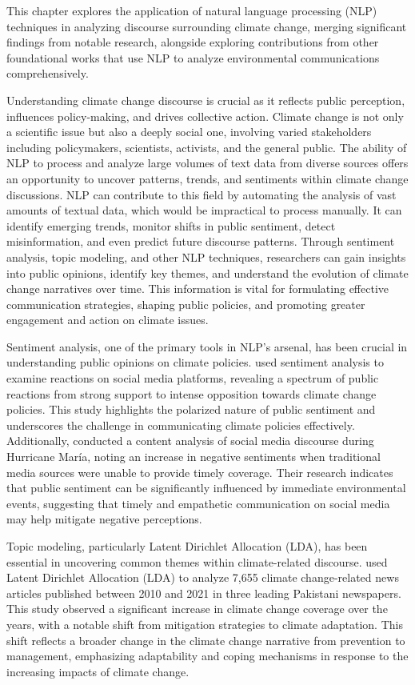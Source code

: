 This chapter explores the application of natural language processing (NLP) techniques in analyzing discourse surrounding climate change, merging significant findings from notable research, alongside exploring contributions from other foundational works that use NLP to analyze environmental communications comprehensively.

Understanding climate change discourse is crucial as it reflects public perception, influences policy-making, and drives collective action. Climate change is not only a scientific issue but also a deeply social one, involving varied stakeholders including policymakers, scientists, activists, and the general public. The ability of NLP to process and analyze large volumes of text data from diverse sources offers an opportunity to uncover patterns, trends, and sentiments within climate change discussions. NLP can contribute to this field by automating the analysis of vast amounts of textual data, which would be impractical to process manually. It can identify emerging trends, monitor shifts in public sentiment, detect misinformation, and even predict future discourse patterns. Through sentiment analysis, topic modeling, and other NLP techniques, researchers can gain insights into public opinions, identify key themes, and understand the evolution of climate change narratives over time. This information is vital for formulating effective communication strategies, shaping public policies, and promoting greater engagement and action on climate issues.

Sentiment analysis, one of the primary tools in NLP's arsenal, has been crucial in understanding public opinions on climate policies. \cite{Amangeldi} used sentiment analysis to examine reactions on social media platforms, revealing a spectrum of public reactions from strong support to intense opposition towards climate change policies. This study highlights the polarized nature of public sentiment and underscores the challenge in communicating climate policies effectively. Additionally, \cite{PerezFigueroa2024} conducted a content analysis of social media discourse during Hurricane María, noting an increase in negative sentiments when traditional media sources were unable to provide timely coverage. Their research indicates that public sentiment can be significantly influenced by immediate environmental events, suggesting that timely and empathetic communication on social media may help mitigate negative perceptions.

Topic modeling, particularly Latent Dirichlet Allocation (LDA), has been essential in uncovering common themes within climate-related discourse. \cite{Ejaz2023} used Latent Dirichlet Allocation (LDA) to analyze 7,655 climate change-related news articles published between 2010 and 2021 in three leading Pakistani newspapers. This study observed a significant increase in climate change coverage over the years, with a notable shift from mitigation strategies to climate adaptation. This shift reflects a broader change in the climate change narrative from prevention to management, emphasizing adaptability and coping mechanisms in response to the increasing impacts of climate change. 

